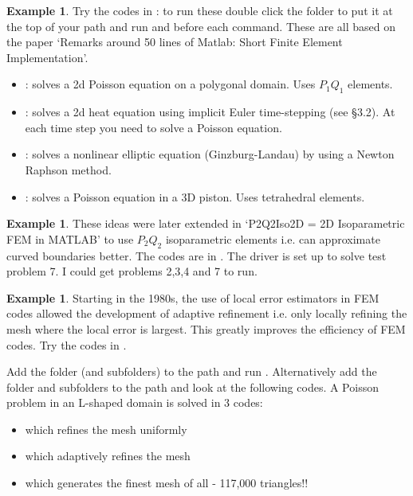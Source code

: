 \documentclass[12pt, a4paper]{article}
\theoremstyle{definition}
\newtheorem{example}[thm]{Example}
\theoremstyle{remark}
\numberwithin{equation}{section}
\begin{document}
\begin{example} 
Try the codes in : to run these double click the folder to put it at the top of your path and run
 and  before each command. These are all based on the paper `Remarks around 50 lines of Matlab: Short Finite Element Implementation'. 
\begin{itemize}
\item {}: solves a 2d Poisson equation on a polygonal domain. 
Uses $P_1Q_1$ elements.
\item {}: solves a 2d heat equation using implicit Euler time-stepping (see \S 3.2). At each time step you need to solve a Poisson equation. 
\item {}: solves a nonlinear elliptic equation (Ginzburg-Landau) by using a Newton Raphson method.
\item {}: solves a Poisson equation in a 3D piston. Uses tetrahedral elements. 
\end{itemize}

\end{example}
\begin{example} 
These ideas were later extended in `P2Q2Iso2D = 2D Isoparametric FEM in MATLAB' to use $P_2Q_2$ isoparametric elements i.e. can approximate 
curved boundaries better. The codes are in . The driver  is set up to solve test problem 7. I could get problems 2,3,4 and 7 to run. 
\end{example}

\begin{example} 
Starting in the 1980s, the use of local error estimators in FEM codes allowed the development of adaptive refinement i.e. only locally refining the mesh where 
the local error is largest. This greatly improves the efficiency of FEM codes. Try the codes in . 

Add the folder (and subfolders)  to the path and run . Alternatively add the folder and subfolders to the path and look at the following codes.
A Poisson problem in an L-shaped domain is solved in 3 codes: 
\begin{itemize}
\item {} which refines the mesh uniformly
\item {} which adaptively refines the mesh
\item {} which generates the finest mesh of all - 117,000 triangles!!
\end{itemize}

\end{example}
\end{document}
